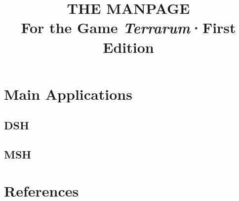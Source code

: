 \documentclass[10pt, stock]{memoir}
\title{\textbf{THE MANPAGE} \\ \vspace{7mm} \large For the Game \emph{Terrarum}\quad ·\quad First Edition}
\date{}
\author{}
\let\oldsection\chapter
\renewcommand\chapter{\clearpage\oldsection}
\begin{document}
\begin{titlingpage}
\maketitle{}
\end{titlingpage}

\setcounter{page}{3}

\tableofcontents*



\chapter{Main Applications}

\section{DSH}


\section{MSH}




\chapter{References}


\afterpage{\pagestyle{empty}\null\newpage}
\end{document}
